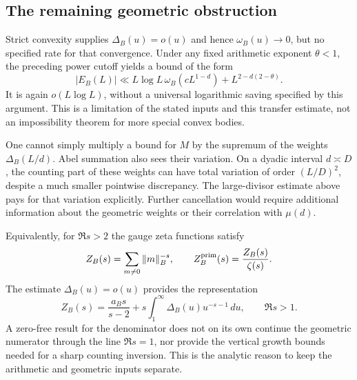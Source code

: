 \subsection{The remaining geometric obstruction}
Strict convexity supplies $\Delta_B(u)=o(u)$ and hence
$\omega_B(u)\to0$, but no specified rate for that convergence.
Under any fixed arithmetic exponent $\theta<1$, the preceding
power cutoff yields a bound of the form
\[
 |E_B(L)|\ll L\log L\,\omega_B(cL^{1-d})
                      +L^{2-d(2-\theta)}.
\]
It is again $o(L\log L)$, without a universal logarithmic saving
specified by this argument.  This is a limitation of the stated inputs
and this transfer estimate, not an impossibility theorem for more
special convex bodies.

One cannot simply multiply a bound for $M$ by the supremum of the
weights $\Delta_B(L/d)$.  Abel summation also sees their variation.
On a dyadic interval $d\asymp D$, the counting part of these weights
can have total variation of order $(L/D)^2$, despite a much smaller
pointwise discrepancy.  The large-divisor estimate above pays for
that variation explicitly.  Further cancellation would require
additional information about the geometric weights or their correlation
with $\mu(d)$.

Equivalently, for $\Re s>2$ the gauge zeta functions satisfy
\[
 Z_B(s)=\sum_{m\ne0}\|m\|_B^{-s},\qquad
 Z_B^{\rm prim}(s)=\frac{Z_B(s)}{\zeta(s)}.
\]
The estimate $\Delta_B(u)=o(u)$ provides the representation
\[
 Z_B(s)=\frac{a_Bs}{s-2}
          +s\int_1^\infty\Delta_B(u)u^{-s-1}\,du,
 \qquad \Re s>1.
\]
A zero-free result for the denominator does not on its own continue
the geometric numerator through the line $\Re s=1$, nor provide the
vertical growth bounds needed for a sharp counting inversion.  This is
the analytic reason to keep the arithmetic and geometric inputs separate.


